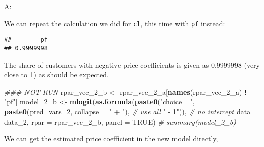\documentclass[
]{article}
\newenvironment{Shaded}{\begin{snugshade}}{\end{snugshade}}
\newcommand{\CommentTok}[1]{\textcolor[rgb]{0.56,0.35,0.01}{\textit{#1}}}
\newcommand{\DataTypeTok}[1]{\textcolor[rgb]{0.13,0.29,0.53}{#1}}
\newcommand{\DecValTok}[1]{\textcolor[rgb]{0.00,0.00,0.81}{#1}}
\newcommand{\KeywordTok}[1]{\textcolor[rgb]{0.13,0.29,0.53}{\textbf{#1}}}
\newcommand{\NormalTok}[1]{#1}
\newcommand{\OperatorTok}[1]{\textcolor[rgb]{0.81,0.36,0.00}{\textbf{#1}}}
\newcommand{\OtherTok}[1]{\textcolor[rgb]{0.56,0.35,0.01}{#1}}
\newcommand{\StringTok}[1]{\textcolor[rgb]{0.31,0.60,0.02}{#1}}
\begin{document}

A:

We can repeat the calculation we did for \texttt{cl}, this time with
\texttt{pf} instead:

\begin{Shaded}
\end{Shaded}

\begin{verbatim}
##        pf 
## 0.9999998
\end{verbatim}

The share of customers with negative price coefficients is given as
0.9999998 (very close to 1) as should be expected.


\begin{Shaded}
\begin{Highlighting}[]
\CommentTok{### NOT RUN}
\NormalTok{rpar_vec_}\DecValTok{2}\NormalTok{_b <-}\StringTok{ }\NormalTok{rpar_vec_}\DecValTok{2}\NormalTok{_a[}\KeywordTok{names}\NormalTok{(rpar_vec_}\DecValTok{2}\NormalTok{_a) }\OperatorTok{!=}\StringTok{ "pf"}\NormalTok{]}
\NormalTok{model_}\DecValTok{2}\NormalTok{_b <-}\StringTok{ }\KeywordTok{mlogit}\NormalTok{(}\KeywordTok{as.formula}\NormalTok{(}\KeywordTok{paste0}\NormalTok{(}\StringTok{"choice ~ "}\NormalTok{,}
                                      \KeywordTok{paste0}\NormalTok{(pred_vars_}\DecValTok{2}\NormalTok{,}
                                             \DataTypeTok{collapse =} \StringTok{" + "}\NormalTok{),  }\CommentTok{# use all}
                                      \StringTok{" - 1"}\NormalTok{)),  }\CommentTok{# no intercept}
                    \DataTypeTok{data =}\NormalTok{ data_}\DecValTok{2}\NormalTok{, }\DataTypeTok{rpar =}\NormalTok{ rpar_vec_}\DecValTok{2}\NormalTok{_b, }\DataTypeTok{panel =} \OtherTok{TRUE}\NormalTok{)}
\CommentTok{# summary(model_2_b)}
\end{Highlighting}
\end{Shaded}

We can get the estimated price coefficient in the new model directly,
\end{document}
